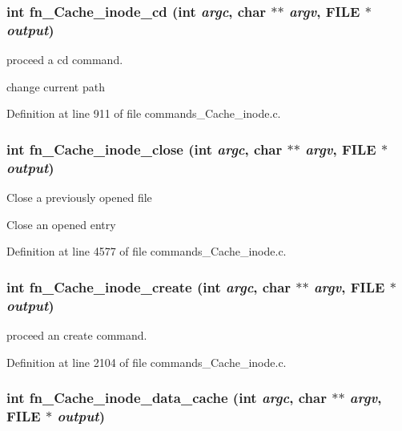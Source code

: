 \subsubsection[{fn\_\-Cache\_\-inode\_\-cd}]{\setlength{\rightskip}{0pt plus 5cm}int fn\_\-Cache\_\-inode\_\-cd (int {\em argc}, \/  char $\ast$$\ast$ {\em argv}, \/  FILE $\ast$ {\em output})}\label{commands_8h_de5ad3cf431b9c4586c59b909c87c6b9}


proceed a cd command.

change current path 

Definition at line 911 of file commands\_\-Cache\_\-inode.c.
\subsubsection[{fn\_\-Cache\_\-inode\_\-close}]{\setlength{\rightskip}{0pt plus 5cm}int fn\_\-Cache\_\-inode\_\-close (int {\em argc}, \/  char $\ast$$\ast$ {\em argv}, \/  FILE $\ast$ {\em output})}\label{commands_8h_f0ca1153461f207ba7c227ef1563feef}


Close a previously opened file

Close an opened entry 

Definition at line 4577 of file commands\_\-Cache\_\-inode.c.
\subsubsection[{fn\_\-Cache\_\-inode\_\-create}]{\setlength{\rightskip}{0pt plus 5cm}int fn\_\-Cache\_\-inode\_\-create (int {\em argc}, \/  char $\ast$$\ast$ {\em argv}, \/  FILE $\ast$ {\em output})}\label{commands_8h_6c91f15dff648eb0932a0bd012182818}


proceed an create command. 

Definition at line 2104 of file commands\_\-Cache\_\-inode.c.
\subsubsection[{fn\_\-Cache\_\-inode\_\-data\_\-cache}]{\setlength{\rightskip}{0pt plus 5cm}int fn\_\-Cache\_\-inode\_\-data\_\-cache (int {\em argc}, \/  char $\ast$$\ast$ {\em argv}, \/  FILE $\ast$ {\em output})}\label{commands_8h_0bdb2b1764b0dfb7ea511b24bb27549c}


